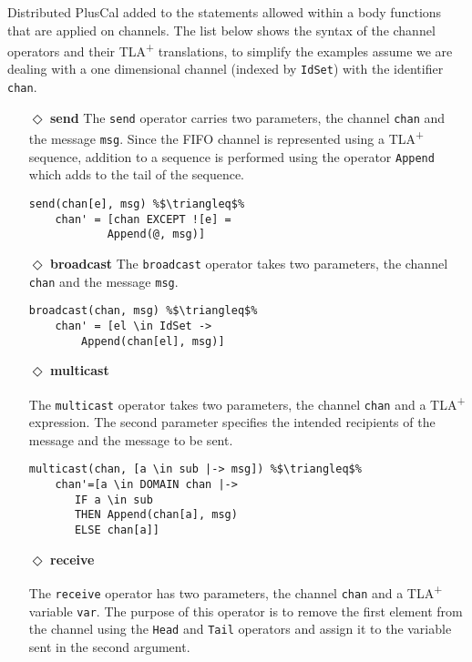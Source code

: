 \documentclass[journal]{IEEEtran}
\newcommand{\tlaplus}{TLA\textsuperscript{+}\xspace}
\begin{document}
Distributed PlusCal added to the statements allowed within a body functions that are applied on channels.
The list below shows the syntax of the channel operators and their \tlaplus translations, to simplify the examples assume we are dealing with a one dimensional channel (indexed by \verb|IdSet|) with the identifier \verb|chan|.

\begin{itemize}

\item[$\Diamond$]  \textbf{send} The \verb|send| operator carries two parameters, the channel \verb|chan| and the message \verb|msg|. Since the FIFO channel is represented using a \tlaplus sequence, addition to a sequence is performed using the operator \verb|Append| which adds to the tail of the sequence.

\begin{lstlisting}[frame = none, numbers = none, escapechar=\%]
send(chan[e], msg) %$\triangleq$%
    chan' = [chan EXCEPT ![e] =
            Append(@, msg)]
\end{lstlisting}


\item[$\Diamond$]  \textbf{broadcast}
The \verb|broadcast| operator takes two parameters, the channel \verb|chan| and the message \verb|msg|.

\begin{lstlisting}[frame = none, numbers = none, escapechar=\%]
broadcast(chan, msg) %$\triangleq$%
    chan' = [el \in IdSet -> 
        Append(chan[el], msg)]
\end{lstlisting}

\item[$\Diamond$] \textbf{multicast}

The \verb|multicast| operator takes two parameters, the channel \verb|chan| and a \tlaplus expression. The second parameter specifies the intended recipients of the message and the message to be sent. 


\begin{lstlisting}[frame = none, numbers = none, escapechar=\%]
multicast(chan, [a \in sub |-> msg]) %$\triangleq$%
    chan'=[a \in DOMAIN chan |-> 
       IF a \in sub 
       THEN Append(chan[a], msg)
       ELSE chan[a]]
\end{lstlisting}

\item[$\Diamond$]  \textbf{receive}

The \verb|receive| operator has two parameters, the channel \verb|chan| and a \tlaplus variable \verb|var|. The purpose of this operator is to remove the first element from the channel using the \verb|Head| and \verb|Tail| operators and assign it to the variable sent in the second argument.


\end{itemize}
\end{document}
